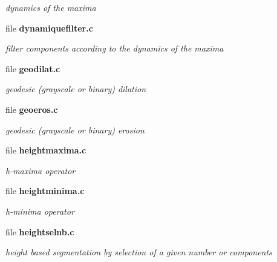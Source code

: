 \begin{DoxyCompactItemize}
\begin{DoxyCompactList}\small\item\em dynamics of the maxima \item\end{DoxyCompactList}

\item 
file {\bf dynamiquefilter.c}


\begin{DoxyCompactList}\small\item\em filter components according to the dynamics of the maxima \item\end{DoxyCompactList}

\item 
file {\bf geodilat.c}


\begin{DoxyCompactList}\small\item\em geodesic (grayscale or binary) dilation \item\end{DoxyCompactList}

\item 
file {\bf geoeros.c}


\begin{DoxyCompactList}\small\item\em geodesic (grayscale or binary) erosion \item\end{DoxyCompactList}

\item 
file {\bf heightmaxima.c}


\begin{DoxyCompactList}\small\item\em h-\/maxima operator \item\end{DoxyCompactList}

\item 
file {\bf heightminima.c}


\begin{DoxyCompactList}\small\item\em h-\/minima operator \item\end{DoxyCompactList}

\item 
file {\bf heightselnb.c}


\begin{DoxyCompactList}\small\item\em height based segmentation by selection of a given number or components \item\end{DoxyCompactList}


\end{DoxyCompactItemize}
